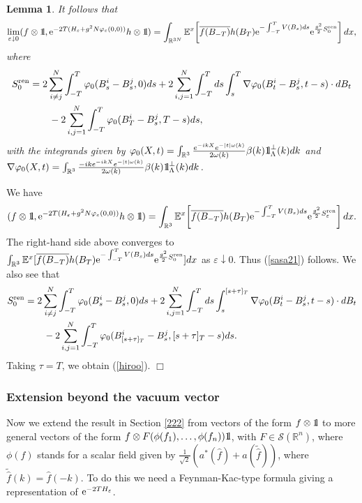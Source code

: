 \documentclass[12pt]{article}
\newtheorem{lemma}[theorem]{Lemma}
\newcommand{\bl}[1]{\begin{lemma}\label{#1}}
\newcommand{\el}{\end{lemma}}
\def\bbbone{{\mathchoice {\rm 1\mskip-4mu l} {\rm 1\mskip-4mu l}
{\rm 1\mskip-4.5mu l} {\rm 1\mskip-5mu l}}}
\def\one{\bbbone}
\newcommand{\kp}{\one_\Lambda^\perp(k)}
\newcommand{\Ebb}{{\mathbb E}}
\providecommand{\eq}[1]{\begin{equation}\label{#1}}
\providecommand{\en}{\end{equation}}
\providecommand{\qed}{\hfill {$\Box$}\par\medskip}
\providecommand{\BR}{{\mathbb{R}^3 }}
\providecommand{\BRN}{{\mathbb{R}^{3N} }}
\providecommand{\iijj}{\sum_{i,j=1}^N}
\renewcommand{\ij}{\sum_{i\not=j}^N}
\providecommand{\RR}{\mathbb{R}}
\providecommand{\kak}[1]{(\ref{#1})}
\providecommand{\hn}{H}%
\providecommand{\ms}[1]{\mathscr{#1}}
\providecommand{\add}{a^\ast}
\providecommand{\ov}[1]{\overline{#1}}
\providecommand{\non}{\nonumber}
\providecommand{\e}{{\rm e}}
\providecommand{\1}{\mathbb{1}}
\providecommand{\eps}{\varepsilon}
\providecommand{\ren}{{\rm ren}}
\begin{document}
\bl{maindenai}
It follows that
\eq{sasa21}
\lim_{\eps\downarrow 0} (f\otimes \one,\e^{-2T(\hn_\eps+g^2N\varphi_\eps(0,0))} h\otimes  \one)
= \int_{\BRN} \Ebb^x\!\left[\ov{f(B_{-T})} h(B_T)\e^{-\int_{-T}^T V(B_s) ds} \e^{\frac{g^2}{2} S_0^\ren }
\right]dx,
\en
where
\begin{align}\label{hiroo}
S_0^\ren
&=
2\ij\int_{-T}^T \varphi_0(B_s^i-B_s^j,0)ds
+2\iijj \int_{-T}^T ds\int_s^T\nabla\varphi_0(B_t^i-B_s^j,t-s) \cdot dB_t  \non \\
&
\qquad -2\iijj \int_{-T}^T \varphi_0(B_T^i-B_s^j,T-s)ds,
\end{align}
with the integrands given by $\varphi_0(X,t)=\int_\BR\frac{e^{-ikX}e^{-|t|\omega(k)}}{2\omega(k)}
\beta(k) \kp dk$ and $\nabla \varphi_0(X,t)=\int_\BR\frac{-ik e^{-ikX}e^{-|t|\omega(k)}}{2\omega(k)}
\beta(k) \kp dk$.
\el
\proof
We have
\eq{554321}
(f\otimes \one, \e^{-2T(\hn_\eps+g^2N\varphi_\eps(0,0))}h\otimes  \one) =
\int_{\BR} \Ebb^x\!\left[\ov{f(B_{-T})} h(B_T)\e^{-\int_{-T}^T V(B_s) ds}
\e^{\frac{g^2}{2} S_\eps^\ren } \right]dx .
\en
The right-hand  side above converges to $\int_{\BR} \Ebb^x [\ov{f(B_{-T})} h(B_T)
\e^{-\int_{-T}^T V(B_s) ds}\e^{\frac{g^2}{2} S_0^\ren} ]dx$ as $\eps\downarrow 0$.
Thus \kak{sasa21} follows. We also see that
\begin{align}
S_0^\ren
&=
2 \ij \int_{-T}^T \varphi_0(B_s^i-B_s^j,0) ds
+ 2\iijj \int_{-T}^T ds\int_s^{[s+\tau]_T}\nabla\varphi_0 (B_t^i-B_s^j,t-s) \cdot dB_t\non\\
&
\qquad - 2\iijj \int_{-T}^T \varphi_0(B^i_{[s+\tau]_T}-B^j_s,[s+\tau]_T-s) ds.
\end{align}
Taking $\tau=T$, we obtain \kak{hiroo}.
\qed



\subsubsection{Extension beyond the vacuum vector}
Now we extend the result in Section \ref{222} from vectors of the form $f\otimes \one$ to more general
vectors of the form $f\otimes F(\phi(f_1),\ldots,\phi(f_n))\one $, with $F\in \ms  S(\RR^n)$, where
$\phi(f)$ stands for a scalar field given by
$\frac{1}{\sqrt 2} (\add(\hat f)+a(\widetilde{\hat f}))$,  where $\widetilde{\hat f}(k)=\hat f(-k)$.
To do this we
need a Feynman-Kac-type formula giving a representation of $\e^{-2T H_\eps}$.
\end{document}
